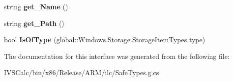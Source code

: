 \begin{DoxyCompactItemize}
\item 
\mbox{\label{interface_windows_1_1_storage_1_1_i_storage_item_a484400e7992b97add1f16fb9c1bee73a}} 
string {\bfseries get\+\_\+\+Name} ()
\item 
\mbox{\label{interface_windows_1_1_storage_1_1_i_storage_item_ae2665e5bf45bb4d62bf1434aa468f431}} 
string {\bfseries get\+\_\+\+Path} ()
\item 
\mbox{\label{interface_windows_1_1_storage_1_1_i_storage_item_a57853bba9d58c4b071bb217028afe56f}} 
bool {\bfseries Is\+Of\+Type} (global\+::\+Windows.\+Storage.\+Storage\+Item\+Types type)
\end{DoxyCompactItemize}


The documentation for this interface was generated from the following file\+:\begin{DoxyCompactItemize}
\item 
I\+V\+S\+Calc/bin/x86/\+Release/\+A\+R\+M/ilc/Safe\+Types.\+g.\+cs\end{DoxyCompactItemize}
